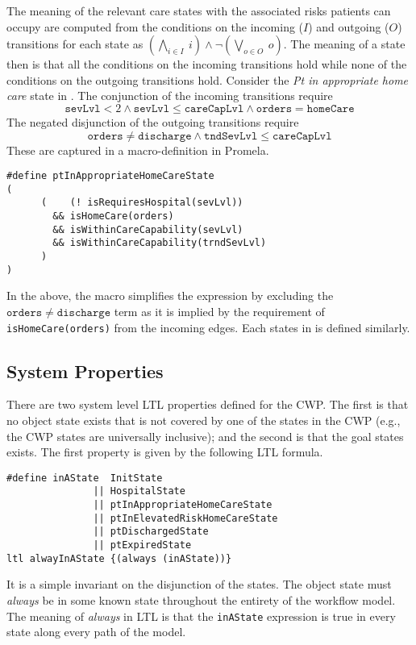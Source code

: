 The meaning of the relevant care states with the associated risks patients can occupy are computed from the conditions on the incoming ($I$) and outgoing ($O$) transitions for each state as $(\bigwedge_{i \in I}\ i) \wedge \neg(\bigvee_{o \in O}\ o)$. The meaning of a state then is that all the conditions on the incoming transitions hold while none of the conditions on the outgoing transitions hold. Consider the \emph{Pt in appropriate home care} state in . The conjunction of the incoming transitions require
%
\[
  \mathtt{sevLvl} < 2 \wedge \mathtt{sevLvl} \le \mathtt{careCapLvl} \wedge \mathtt{orders} = \mathtt{homeCare}
\]
%
The negated disjunction of the outgoing transitions require
%
\[
  \mathtt{orders} \neq \mathtt{discharge} \wedge \mathtt{tndSevLvl} \le \mathtt{careCapLvl}
\]
%
\noindent These are captured in a macro-definition in Promela.
%
{\small
\begin{lstlisting}[style=myPromela]
#define ptInAppropriateHomeCareState
(
      (    (! isRequiresHospital(sevLvl))
        && isHomeCare(orders)                                      
        && isWithinCareCapability(sevLvl)
        && isWithinCareCapability(trndSevLvl)
      )
)
\end{lstlisting}
}
%
\noindent In the above, the macro simplifies the expression by excluding the $\mathtt{orders} \neq \mathtt{discharge}$ term as it is implied by the requirement of \texttt{isHomeCare(orders)} from the incoming edges. Each states in  is defined similarly.

\subsection{System Properties}
There are two system level LTL properties defined for the CWP. The first is that no object state exists that is not covered by one of the states in the CWP (e.g., the CWP states are universally inclusive); and the second is that the goal states exists. The first property is given by the following LTL formula.
%
{\small
\begin{lstlisting}[style=myPromela]
#define inAState  InitState
               || HospitalState
               || ptInAppropriateHomeCareState
               || ptInElevatedRiskHomeCareState
               || ptDischargedState
               || ptExpiredState
ltl alwayInAState {(always (inAState))}
\end{lstlisting}
}
%
\noindent It is a simple invariant on the disjunction of the states. The object state must \emph{always} be in some known state throughout the entirety of the workflow model. The meaning of \emph{always} in LTL is that the \texttt{inAState} expression is true in every state along every path of the model.

